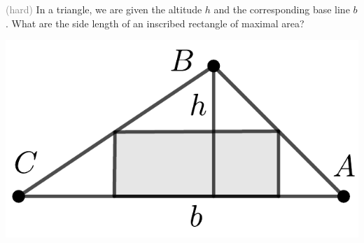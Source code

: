 \begin{minipage}{0.7\textwidth}
\begin{exercise}
	\textcolor{gray}{(hard)} In a triangle, we are given the altitude $h$ and the corresponding base line $b$.
	What are the side length of an inscribed rectangle of maximal area?
\end{exercise}
\end{minipage}\hfill
\begin{minipage}{0.25\textwidth}
	\includegraphics[width=\textwidth]{images/triangle}
\end{minipage}\\
